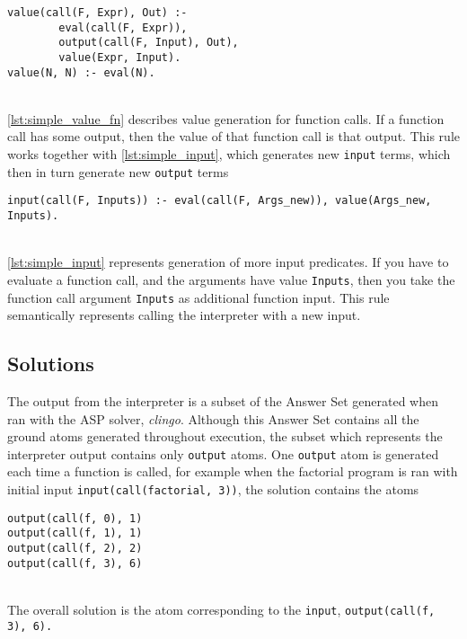 \begin{lstlisting}[caption={Value generation for function calls}, label={lst:simple_value_fn}, firstnumber=72]
value(call(F, Expr), Out) :- 
		eval(call(F, Expr)), 
		output(call(F, Input), Out), 
		value(Expr, Input).	
value(N, N) :- eval(N).
\end{lstlisting}
\mbox{}\\
\ref{lst:simple_value_fn} describes value generation for function calls. If a function call has some output, then the value of that function call is that output. This rule works together with \ref{lst:simple_input}, which generates new \lstinline!input! terms, which then in turn generate new \lstinline!output! terms\\

\begin{lstlisting}[caption={Input generation}, label={lst:simple_input}, firstnumber=121]
input(call(F, Inputs)) :- eval(call(F, Args_new)), value(Args_new, Inputs).
\end{lstlisting}
\mbox{} \\
\ref{lst:simple_input} represents generation of more input predicates. If you have to evaluate a function call, and the arguments have value \lstinline!Inputs!, then you take the function call argument \lstinline!Inputs! as additional function input. This rule semantically represents calling the interpreter with a new input.

\subsection{Solutions}
The output from the interpreter is a subset of the Answer Set generated when ran with the ASP solver, \textit{clingo}. Although this Answer Set contains all the ground atoms generated throughout execution, the subset which represents the interpreter output contains only \lstinline!output! atoms. One \lstinline!output! atom is generated each time a function is called, for example when the factorial program is ran with initial input \lstinline!input(call(factorial, 3))!, the solution contains the atoms \\

\begin{lstlisting}
output(call(f, 0), 1)
output(call(f, 1), 1) 
output(call(f, 2), 2) 
output(call(f, 3), 6)
\end{lstlisting}
\mbox{}\\
The overall solution is the atom corresponding to the \lstinline!input!, \lstinline!output(call(f, 3), 6).!

